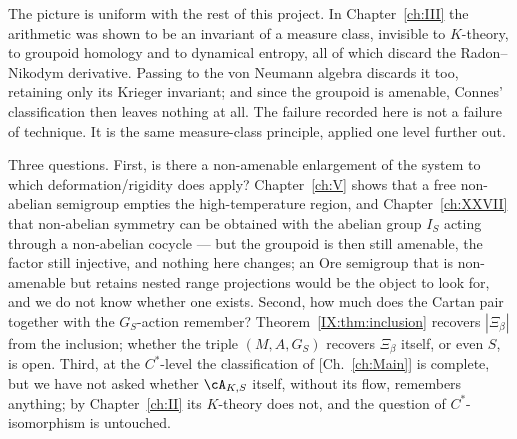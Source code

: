 The picture is uniform with the rest of this project. In Chapter~\ref{ch:III} the
arithmetic was shown to be an invariant of a measure class, invisible to $K$-theory, to groupoid homology
and to dynamical entropy, all of which discard the Radon--Nikodym derivative. Passing to the
von Neumann algebra discards it too, retaining only its Krieger invariant; and since the
groupoid is amenable, Connes' classification then leaves nothing at all. The failure recorded
here is not a failure of technique. It is the same measure-class principle, applied one level
further out.

Three questions. First, is there a non-amenable enlargement of the system to which
deformation/rigidity does apply? Chapter~\ref{ch:V} shows that a free non-abelian
semigroup empties the high-temperature region, and Chapter~\ref{ch:XXVII} that non-abelian symmetry
can be obtained with the abelian group $I_S$ acting through a non-abelian cocycle --- but
the groupoid is then still amenable, the factor still injective, and nothing here changes;
an Ore semigroup that is non-amenable but retains nested range projections would be the
object to look for, and we do not know whether one exists. Second, how much does the Cartan pair together with the
$G_S$-action remember? Theorem~\ref{IX:thm:inclusion} recovers $|\Xi_\beta|$ from the inclusion;
whether the triple $(M,A,G_S)$ recovers $\Xi_\beta$ itself, or even $S$, is open. Third, at
the $C^*$-level the classification of [Ch.~\ref{ch:Main}] is complete, but we have not asked whether
$\cA_{K,S}$ itself, without its flow, remembers anything; by Chapter~\ref{ch:II} its $K$-theory does
not, and the question of $C^*$-isomorphism is untouched.


